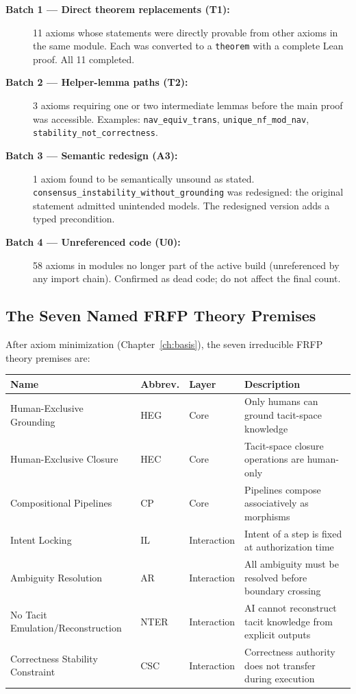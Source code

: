 \begin{description}
  \item[\textbf{Batch 1 --- Direct theorem replacements (T1):}]
        11 axioms whose statements were directly provable from other axioms in
        the same module. Each was converted to a \texttt{theorem} with a complete
        Lean proof. All 11 completed.

  \item[\textbf{Batch 2 --- Helper-lemma paths (T2):}]
        3 axioms requiring one or two intermediate lemmas before the main proof
        was accessible. Examples: \texttt{nav\_equiv\_trans},
        \texttt{unique\_nf\_mod\_nav}, \texttt{stability\_not\_correctness}.

  \item[\textbf{Batch 3 --- Semantic redesign (A3):}]
        1 axiom found to be semantically unsound as stated.
        \texttt{consensus\_instability\_without\_grounding} was redesigned: the
        original statement admitted unintended models. The redesigned version adds
        a typed precondition.

  \item[\textbf{Batch 4 --- Unreferenced code (U0):}]
        58 axioms in modules no longer part of the active build (unreferenced by
        any import chain). Confirmed as dead code; do not affect the final count.
\end{description}

\subsection{The Seven Named FRFP Theory Premises}

After axiom minimization (Chapter~\ref{ch:basis}), the seven irreducible FRFP
theory premises are:

\begin{center}
\begin{tabular}{lllp{6cm}}
\toprule
Name & Abbrev. & Layer & Description \\
\midrule
Human-Exclusive Grounding & HEG & Core & Only humans can ground tacit-space knowledge \\
Human-Exclusive Closure & HEC & Core & Tacit-space closure operations are human-only \\
Compositional Pipelines & CP & Core & Pipelines compose associatively as morphisms \\
Intent Locking & IL & Interaction & Intent of a step is fixed at authorization time \\
Ambiguity Resolution & AR & Interaction & All ambiguity must be resolved before boundary crossing \\
No Tacit Emulation/Reconstruction & NTER & Interaction & AI cannot reconstruct tacit knowledge from explicit outputs \\
Correctness Stability Constraint & CSC & Interaction & Correctness authority does not transfer during execution \\
\bottomrule
\end{tabular}
\end{center}

